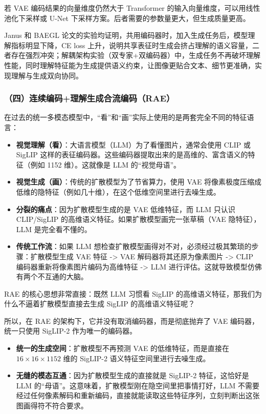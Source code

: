 若 VAE 编码结果的向量维度仍然大于 Transformer 的输入向量维度，可以用线性池化下采样或 U-Net 下采样方案。后者需要的参数量更大，但生成质量更高。

Janus 和 BAEGL 论文的实验均证明，共用编码器时，加入生成任务后，模型理解指标明显下降，CE loss 上升，说明共享表征时生成会挤占理解的语义容量，二者存在强烈冲突；解耦架构实验（双专家+双编码器）中，生成任务不再破坏理解性能，同时理解特征能为生成提供语义约束，让图像更贴合文本、细节更准确，实现理解与生成双向协同。

\hypertarget{ux56dbux8fdeux7eedux7f16ux7801ux7406ux89e3ux751fux6210ux5408ux6d41ux7f16ux7801rae}{%
\subsubsection{（四）连续编码+理解生成合流编码（RAE）}\label{ux56dbux8fdeux7eedux7f16ux7801ux7406ux89e3ux751fux6210ux5408ux6d41ux7f16ux7801rae}}

在过去的统一多模态模型中，``看''和``画''实际上使用的是两套完全不同的特征语言：

\begin{itemize}
\item
  \textbf{视觉理解（看）}：大语言模型（LLM）为了看懂图片，通常会使用 CLIP 或 SigLIP 这样的表征编码器。这些编码器提取出来的是高维的、富含语义的特征（例如 1152 维）。这就像是 LLM 的``视觉母语''。
\item
  \textbf{视觉生成（画）}：传统的扩散模型为了节省算力，使用 VAE 将像素极度压缩成低维的隐特征（例如几十维），在这个低维空间里进行去噪生成。
\item
  \textbf{分裂的痛点}：因为扩散模型生成的是 VAE 低维特征，而 LLM 只认识 CLIP/SigLIP 的高维语义特征。如果扩散模型画完一张草稿（VAE 隐特征），LLM 是完全看不懂的。
\item
  \textbf{传统工作流}：如果 LLM 想检查扩散模型画得对不对，必须经过极其繁琐的步骤：扩散模型生成 VAE 特征 -\textgreater{} VAE 解码器将其还原为像素图片 -\textgreater{} CLIP 编码器重新将像素图片编码为高维特征 -\textgreater{} LLM 进行评估。这就导致模型仿佛有两个不互通的大脑。
\end{itemize}

RAE 的核心思想非常直接：既然 LLM 习惯看 SigLIP 的高维语义特征，那我们为什么不逼着扩散模型直接去生成 SigLIP 的高维语义特征呢？

所以，在 RAE 的架构下，它并没有取消编码器，而是彻底抛弃了 VAE 编码器，统一只使用 SigLIP-2 作为唯一的编码器。

\begin{itemize}
\tightlist
\item
  \textbf{统一的生成空间}：扩散模型不再预测 VAE 的低维特征，而是直接在 \(16\times16\times1152\) 维的 SigLIP-2 语义特征空间里进行去噪生成。
\item
  \textbf{无缝的模态互通}：因为扩散模型生成的直接就是 SigLIP-2 特征，这恰好是 LLM 的``母语''。这意味着，扩散模型刚在隐空间里把事情打好，LLM 不需要经过任何像素解码和重新编码，直接就能读取这些特征序列，立刻判断出这张图画得符不符合要求。
\end{itemize}

